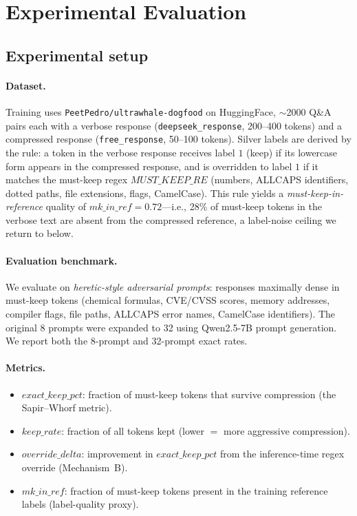 \section{Experimental Evaluation}
\label{sec:evaluation}

\subsection{Experimental setup}
\label{sec:setup}

\paragraph{Dataset.} Training uses \texttt{PeetPedro/ultrawhale-dogfood} on
HuggingFace, $\sim$2000 Q\&A pairs each with a verbose response
(\texttt{deepseek\_response}, 200--400 tokens) and a compressed response
(\texttt{free\_response}, 50--100 tokens). Silver labels are derived by the
rule: a token in the verbose response receives label $1$ (keep) if its
lowercase form appears in the compressed response, and is overridden to label
$1$ if it matches the must-keep regex $\mathit{MUST\_KEEP\_RE}$
(numbers, ALLCAPS identifiers, dotted paths, file extensions, flags,
CamelCase). This rule yields a \emph{must-keep-in-reference} quality of
$\mathit{mk\_in\_ref}=0.72$---i.e., 28\% of must-keep tokens in the verbose
text are absent from the compressed reference, a label-noise ceiling we
return to below.

\paragraph{Evaluation benchmark.} We evaluate on \emph{heretic-style
adversarial prompts}: responses maximally dense in must-keep tokens
(chemical formulas, CVE/CVSS scores, memory addresses, compiler flags, file
paths, ALLCAPS error names, CamelCase identifiers). The original 8 prompts
were expanded to 32 using Qwen2.5-7B prompt generation. We report both the
8-prompt and 32-prompt exact rates.

\paragraph{Metrics.}
\begin{itemize}
  \item $\mathit{exact\_keep\_pct}$: fraction of must-keep tokens that survive
        compression (the Sapir--Whorf metric).
  \item $\mathit{keep\_rate}$: fraction of all tokens kept (lower $=$ more
        aggressive compression).
  \item $\mathit{override\_delta}$: improvement in $\mathit{exact\_keep\_pct}$
        from the inference-time regex override (Mechanism~B).
  \item $\mathit{mk\_in\_ref}$: fraction of must-keep tokens present in the
        training reference labels (label-quality proxy).
\end{itemize}

